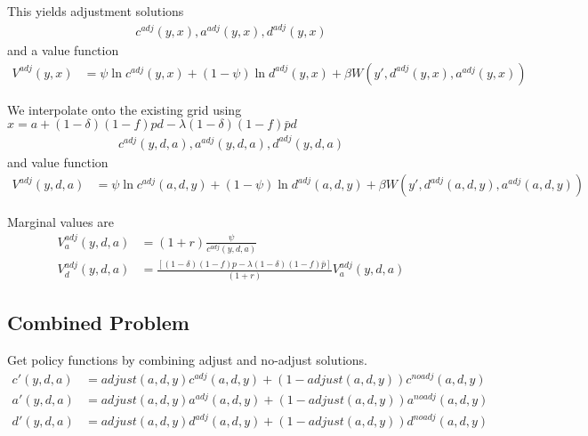 \documentclass[11pt]{article}
\begin{document}
This yields adjustment solutions
\begin{align*}
    c^{adj}(y,x), a^{adj}(y,x), d^{adj}(y,x)
\end{align*}
and a value function
\begin{align*}
    V^{adj}(y,x) &= \psi \ln c^{adj}(y,x) +(1-\psi) \ln d^{adj}(y,x) + \beta W(y',d^{adj}(y,x),a^{adj}(y,x)) 
\end{align*}

We interpolate onto the existing grid using $x=a+(1-\delta)(1-f)pd - \lambda(1-\delta)(1-f)\bar{p} d$
\begin{align*}
    c^{adj}(y,d,a), a^{adj}(y,d,a), d^{adj}(y,d,a)
\end{align*}
and value function
\begin{align*}
    V^{adj}(y,d,a) &= \psi \ln c^{adj}(a,d,y) +(1-\psi) \ln d^{adj}(a,d,y) + \beta W(y',d^{adj}(a,d,y),a^{adj}(a,d,y)) 
\end{align*}

Marginal values are
\begin{align*}
    V_a^{adj}(y,d,a)&=(1+r)\frac{\psi}{c^{adj}(y,d,a)} \\
    V_d^{adj}(y,d,a)&=\frac{[(1-\delta)(1-f) p - \lambda(1-\delta)(1-f)\bar{p}]}{(1+r)} V_a^{adj}(y,d,a)
\end{align*}


\subsection{Combined Problem}

Get policy functions by combining adjust and no-adjust solutions.
\begin{align*}
    c'(y,d,a) &= adjust(a,d,y)c^{adj}(a,d,y) + (1-adjust(a,d,y))c^{noadj}(a,d,y) \\
    a'(y,d,a) &= adjust(a,d,y)a^{adj}(a,d,y) + (1-adjust(a,d,y))a^{noadj}(a,d,y) \\
    d'(y,d,a) &= adjust(a,d,y)d^{adj}(a,d,y) + (1-adjust(a,d,y))d^{noadj}(a,d,y) 
\end{align*}

\end{document}
